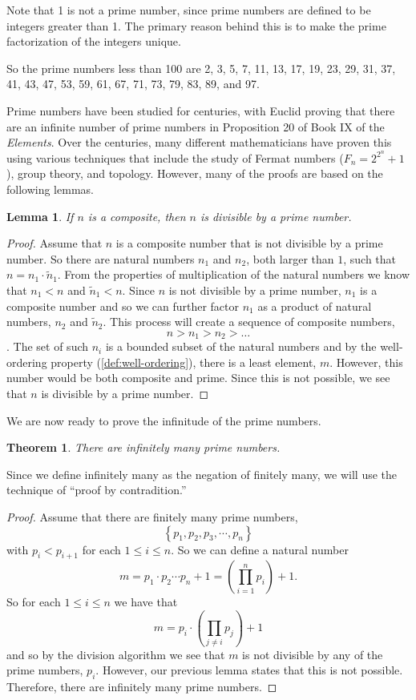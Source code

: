\documentclass[
]{book}
\newtheorem{theorem}{Theorem}[chapter]
\newtheorem{lemma}{Lemma}[chapter]
\theoremstyle{definition}
\theoremstyle{definition}
\theoremstyle{definition}
\theoremstyle{definition}
\theoremstyle{remark}
\begin{document}
Note that 1 is not a prime number, since prime numbers are defined to be integers greater than 1. The primary reason behind this is to make the prime factorization of the integers unique.

So the prime numbers less than 100 are 2, 3, 5, 7, 11, 13, 17, 19, 23, 29, 31, 37, 41, 43, 47, 53, 59, 61, 67, 71, 73, 79, 83, 89, and 97.

Prime numbers have been studied for centuries, with Euclid proving that there are an infinite number of prime numbers in Proposition 20 of Book IX of the \emph{Elements}. Over the centuries, many different mathematicians have proven this using various techniques that include the study of Fermat numbers (\(F_n=2^{2^n}+1\)), group theory, and topology. However, many of the proofs are based on the following lemmas.

\begin{lemma}
If \(n\) is a composite, then \(n\) is divisible by a prime number.
\end{lemma}

\begin{proof}
Assume that \(n\) is a composite number that is not divisible by a prime number. So there are natural numbers \(n_1\) and \(n_2\), both larger than \(1\), such that \(n=n_1 \cdot \tilde{n}_1\). From the properties of multiplication of the natural numbers we know that \(n_1<n\) and \(\tilde{n}_1<n\). Since \(n\) is not divisible by a prime number, \(n_1\) is a composite number and so we can further factor \(n_1\) as a product of natural numbers, \(n_2\) and \(\tilde{n}_2\). This process will create a sequence of composite numbers, \[n>n_1>n_2>\ldots\]. The set of such \(n_i\) is a bounded subset of the natural numbers and by the well-ordering property (\ref{def:well-ordering}), there is a least element, \(m\). However, this number would be both composite and prime. Since this is not possible, we see that \(n\) is divisible by a prime number.
\end{proof}

We are now ready to prove the infinitude of the prime numbers.

\begin{theorem}
There are infinitely many prime numbers.
\end{theorem}

Since we define infinitely many as the negation of finitely many, we will use the technique of ``proof by contradition.''

\begin{proof}
Assume that there are finitely many prime numbers, \[\left\{ p_1, p_2, p_3, \cdots, p_n\right\}\] with \(p_i<p_{i+1}\) for each \(1\leq i \leq n\). So we can define a natural number \[m= p_1 \cdot p_2 \cdots p_n +1 = \left( \prod_{i=1}^n p_i \right) +1.\] So for each \(1\leq i \leq n\) we have that \[m= p_i \cdot \left(\prod_{j\neq i} p_j\right) +1\] and so by the division algorithm we see that \(m\) is not divisible by any of the prime numbers, \(p_i\). However, our previous lemma states that this is not possible. Therefore, there are infinitely many prime numbers.
\end{proof}
\end{document}
